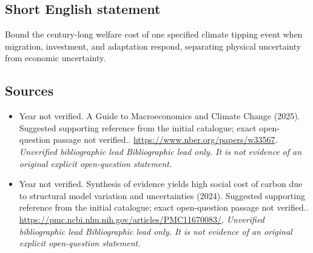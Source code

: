 \documentclass[11pt]{article}
\begin{document}
\subsection{Short English statement}
Bound the century-long welfare cost of one specified climate tipping event when migration, investment, and adaptation respond, separating physical uncertainty from economic uncertainty.

\subsection{Sources}
\begin{itemize}\raggedright
\item[\textnormal{[S1]}]\hypertarget{source:30007713:1}{} Year not verified. A Guide to Macroeconomics and Climate Change (2025). Suggested supporting reference from the initial catalogue; exact open-question passage not verified..
\url{https://www.nber.org/papers/w33567}.
{\small\textit{Unverified bibliographic lead Bibliographic lead only. It is not evidence of an original explicit open-question statement.}}

\item[\textnormal{[S2]}]\hypertarget{source:30007713:2}{} Year not verified. Synthesis of evidence yields high social cost of carbon due to structural model variation and uncertainties (2024). Suggested supporting reference from the initial catalogue; exact open-question passage not verified..
\url{https://pmc.ncbi.nlm.nih.gov/articles/PMC11670083/}.
{\small\textit{Unverified bibliographic lead Bibliographic lead only. It is not evidence of an original explicit open-question statement.}}
\end{itemize}
\end{document}
